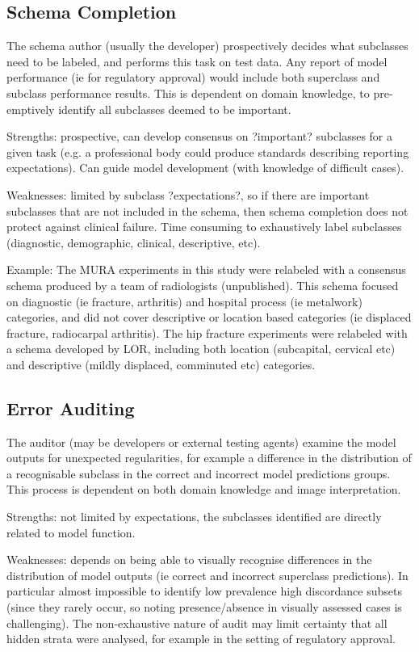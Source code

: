 \documentclass{article}
\begin{document}
\subsection{Schema Completion}
The schema author (usually the developer) prospectively decides what subclasses need to be labeled, and performs this task on test data. Any report of model performance (ie for regulatory approval) would include both superclass and subclass performance results. 
This is dependent on domain knowledge, to pre-emptively identify all subclasses deemed to be important. 

Strengths: prospective, can develop consensus on ?important? subclasses for a given task (e.g. a professional body could produce standards describing reporting expectations). Can guide model development (with knowledge of difficult cases).

Weaknesses: limited by subclass ?expectations?, so if there are important subclasses that are not included in the schema, then schema completion does not protect against clinical failure. Time consuming to exhaustively label subclasses (diagnostic, demographic, clinical, descriptive, etc).

Example: The MURA experiments in this study were relabeled with a consensus schema produced by a team of radiologists (unpublished). This schema focused on diagnostic (ie fracture, arthritis) and hospital process (ie metalwork) categories, and did not cover descriptive or location based categories (ie displaced fracture, radiocarpal arthritis).
The hip fracture experiments were relabeled with a schema developed by LOR, including both location (subcapital, cervical etc) and descriptive (mildly displaced, comminuted etc) categories.

\subsection{Error Auditing}
The auditor (may be developers or external testing agents) examine the model outputs for unexpected regularities, for example a difference in the distribution of a recognisable subclass in the correct and incorrect model predictions groups. 
This process is dependent on both domain knowledge and image interpretation. 

Strengths: not limited by expectations, the subclasses identified are directly related to model function. 

Weaknesses: depends on being able to visually recognise differences in the distribution of model outputs (ie correct and incorrect superclass predictions). In particular almost impossible to identify low prevalence high discordance subsets (since they rarely occur, so noting presence/absence in visually assessed cases is challenging). The non-exhaustive nature of audit may limit certainty that all hidden strata were analysed, for example in the setting of regulatory approval.
\end{document}
